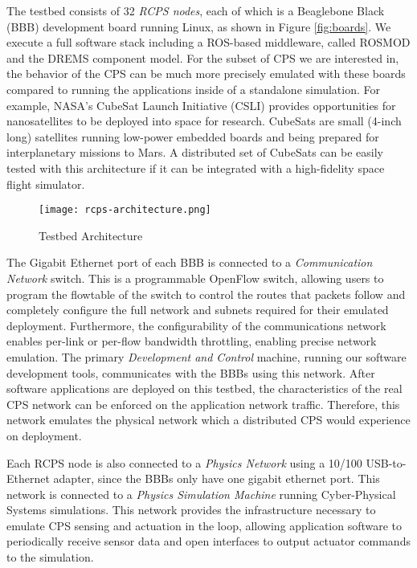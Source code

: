 The testbed consists of 32 \emph{RCPS nodes}, each of which is a Beaglebone Black (BBB) \cite{BBB} development board running Linux, as shown in Figure \ref{fig:boards}. We execute a full software stack including a ROS-based middleware, called ROSMOD \cite{kumarROSMOD} and the DREMS component model. For the subset of CPS we are interested in, the behavior of the CPS can be much more precisely emulated with these boards compared to running the applications inside of a standalone simulation. For example, NASA's CubeSat Launch Initiative (CSLI) \cite{CubeSat} provides opportunities for nanosatellites to be deployed into space for research. CubeSats are small (4-inch long) satellites running low-power embedded boards and being prepared for interplanetary missions \cite{CubeSat_Mars} to Mars. A distributed set of CubeSats can be easily tested with this architecture if it can be integrated with a high-fidelity space flight simulator.  

\begin{figure}[h]
    \centering
    \texttt{[image: rcps-architecture.png]}
    \caption{Testbed Architecture}
    \label{fig:architecture}
\end{figure}

The Gigabit Ethernet port of each BBB is connected to a \emph{Communication Network} switch. This is a programmable OpenFlow \cite{openflow} switch, allowing users to program the flowtable of the switch to control the routes that packets follow and completely configure the full network and subnets required for their emulated deployment.  Furthermore, the configurability of the communications network enables per-link or per-flow bandwidth throttling, enabling precise network emulation.  The primary \emph{Development and Control} machine, running our software development tools, communicates with the BBBs using this network. After software applications are deployed on this testbed, the characteristics of the real CPS network can be enforced on the application network traffic. Therefore, this network emulates the physical network which a distributed CPS would experience on deployment.

Each RCPS node is also connected to a \emph{Physics Network} using a 10/100 USB-to-Ethernet adapter, since the BBBs only have one gigabit ethernet port. This network is connected to a \emph{Physics Simulation Machine} running Cyber-Physical Systems simulations. This network provides the infrastructure necessary to emulate CPS sensing and actuation in the loop, allowing application software to periodically receive sensor data and open interfaces to output actuator commands to the simulation.

